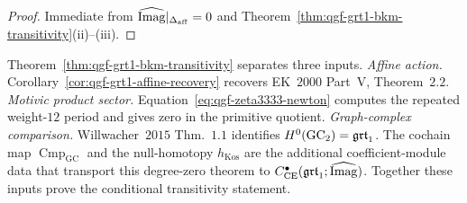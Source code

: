 \begin{proof}
Immediate from $\widehat{\mathrm{Imag}}|_{\Delta_{\mathrm{aff}}} = 0$ and
Theorem~\ref{thm:qgf-grt1-bkm-transitivity}(ii)--(iii).
\end{proof}

\begin{remark}
\label{rem:qgf-grt1-three-paths}
Theorem~\ref{thm:qgf-grt1-bkm-transitivity} separates three inputs.
\emph{Affine action.}
Corollary~\ref{cor:qgf-grt1-affine-recovery} recovers EK~$2000$
Part~V, Theorem~$2.2$.  \emph{Motivic product sector.}
Equation~\eqref{eq:qgf-zeta3333-newton} computes the repeated
weight-$12$ period and gives zero in the primitive quotient.
\emph{Graph-complex comparison.}
Willwacher~$2015$ Thm.~$1.1$ identifies $H^0(\mathrm{GC}_2) =
\mathfrak{grt}_1$.  The cochain map $\operatorname{Cmp}_{\mathrm{GC}}$ and the
null-homotopy $h_{\mathrm{Kos}}$ are the additional coefficient-module
data that transport this degree-zero theorem to
$C^\bullet_{\mathrm{CE}}(\mathfrak{grt}_1;\widehat{\mathrm{Imag}})$.  Together these inputs
prove the conditional transitivity statement.
\end{remark}

